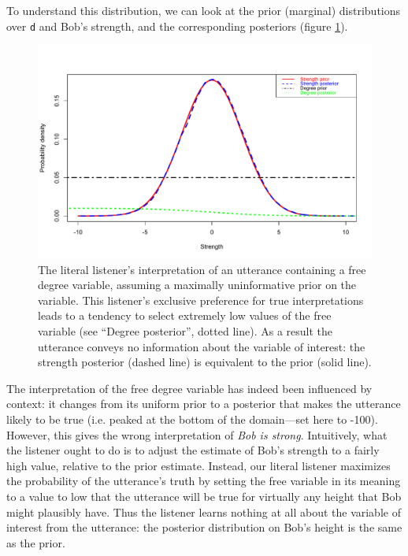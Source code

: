 \documentclass[pdfextras]{handbook}
\begin{document}
To understand this distribution, we can look at 
the prior (marginal) distributions over \lstinline{d} and Bob's strength, and the corresponding posteriors (figure \ref{strong-L0}).
%
\begin{figure}[tbh]
\begin{center}
\includegraphics[scale=.5]{strong-L0.pdf}
\end{center}
\label{strong-L0}
\caption{The literal listener's interpretation of an utterance containing a free degree variable, assuming a maximally uninformative prior on the variable. 
This listener's exclusive preference for true interpretations leads to a tendency to select extremely low values of the free variable (see ``Degree posterior'', dotted line). As a result the utterance conveys no information about the variable of interest: the strength posterior (dashed line) is equivalent to the prior (solid line).}
\end{figure}
%
The interpretation of the free degree variable has indeed been influenced by context: it changes from its uniform prior to a posterior that makes the utterance likely to be true (i.e. peaked at the bottom of the domain---set here to -100). 
However, this gives the wrong interpretation of \emph{Bob is strong}. Intuitively, what the listener ought to do is to adjust the estimate of Bob's strength to a fairly high value, relative to the prior estimate. 
Instead, our literal listener maximizes the probability of the utterance's truth by setting the free variable in its meaning to a value to low that the utterance will be true for virtually any height that Bob might plausibly have. 
Thus the listener learns nothing at all about the variable of interest from the utterance: the posterior distribution on Bob's height is the same as the prior.
\end{document}
